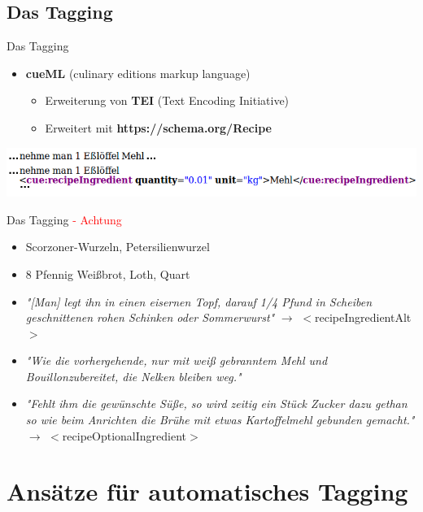 \documentclass[12pt]{beamer}
\begin{document}
\subsection{Das Tagging}
\begin{frame}{Das Tagging}
	\begin{itemize}
		\item \textbf{cueML} (culinary editions markup language)
		\begin{itemize}
			\item Erweiterung von \textbf{TEI} (Text Encoding Initiative)
			\item Erweitert mit \textbf{https://schema.org/Recipe}
		\end{itemize}
	\end{itemize}
	\includegraphics[scale=0.45]{Images/TagBeispiel}
\end{frame}

\begin{frame}{Das Tagging \textcolor{red}{ - Achtung}}
	\begin{itemize}
		\item Scorzoner-Wurzeln, Petersilienwurzel
		\item 8 Pfennig Weißbrot, Loth, Quart
		\item \textit{"[Man] legt ihn in einen eisernen Topf, darauf 1/4 Pfund in Scheiben geschnittenen rohen Schinken oder Sommerwurst"} $\rightarrow$ \textcolor{lila}{$<$recipeIngredientAlt$>$}
		\item \textit{"Wie die vorhergehende, nur mit weiß gebranntem Mehl und Bouillonzubereitet, die Nelken bleiben weg."}
		\item \textit{"Fehlt ihm die gewünschte Süße, so wird zeitig ein Stück Zucker dazu gethan so wie beim Anrichten die Brühe mit etwas Kartoffelmehl gebunden gemacht."} \\ $\rightarrow$ \textcolor{lila}{$<$recipeOptionalIngredient$>$}
	\end{itemize}
\end{frame}


\section{Ansätze für automatisches Tagging}
\end{document}
